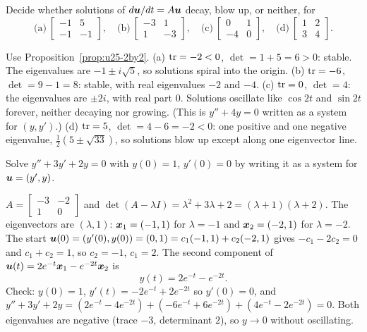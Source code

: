 \begin{exercise}\label{exr:u25-classify}
Decide whether solutions of $d\boldsymbol{u}/dt=A\boldsymbol{u}$ decay, blow up, or neither, for
\[
  \text{(a)}\ \begin{bmatrix} -1&5\\ -1&-1\end{bmatrix},\quad
  \text{(b)}\ \begin{bmatrix} -3&1\\ 1&-3\end{bmatrix},\quad
  \text{(c)}\ \begin{bmatrix} 0&1\\ -4&0\end{bmatrix},\quad
  \text{(d)}\ \begin{bmatrix} 1&2\\ 3&4\end{bmatrix}.
\]
\end{exercise}
\begin{solution}
Use Proposition~\ref{prop:u25-2by2}.
(a) $\operatorname{tr}=-2<0$, $\det=1+5=6>0$: stable. The eigenvalues are $-1\pm i\sqrt5$, so solutions
spiral into the origin.
(b) $\operatorname{tr}=-6$, $\det=9-1=8$: stable, with real eigenvalues $-2$ and $-4$.
(c) $\operatorname{tr}=0$, $\det=4$: the eigenvalues are $\pm2i$, with real part $0$. Solutions oscillate
like $\cos2t$ and $\sin2t$ forever, neither decaying nor growing. (This is $y''+4y=0$
written as a system for $(y,y')$.)
(d) $\operatorname{tr}=5$, $\det=4-6=-2<0$: one positive and one negative eigenvalue,
$\tfrac12(5\pm\sqrt{33})$, so solutions blow up except along one eigenvector line.
\end{solution}

\begin{exercise}\label{exr:u25-damped}
Solve $y''+3y'+2y=0$ with $y(0)=1$, $y'(0)=0$ by writing it as a system for
$\boldsymbol{u}=(y',y)$.
\end{exercise}
\begin{solution}
$A=\left[\begin{smallmatrix} -3&-2\\ 1&0\end{smallmatrix}\right]$ and
$\det(A-\lambda I)=\lambda^{2}+3\lambda+2=(\lambda+1)(\lambda+2)$. The eigenvectors are
$(\lambda,1)$: $\boldsymbol{x}_1=(-1,1)$ for $\lambda=-1$ and $\boldsymbol{x}_2=(-2,1)$ for $\lambda=-2$.
The start $\boldsymbol{u}(0)=(y'(0),y(0))=(0,1)=c_1(-1,1)+c_2(-2,1)$ gives $-c_1-2c_2=0$ and
$c_1+c_2=1$, so $c_2=-1$, $c_1=2$. The second component of
$\boldsymbol{u}(t)=2e^{-t}\boldsymbol{x}_1-e^{-2t}\boldsymbol{x}_2$ is
\[
  y(t)=2e^{-t}-e^{-2t}.
\]
Check: $y(0)=1$, $y'(t)=-2e^{-t}+2e^{-2t}$ so $y'(0)=0$, and
$y''+3y'+2y=(2e^{-t}-4e^{-2t})+(-6e^{-t}+6e^{-2t})+(4e^{-t}-2e^{-2t})=0$. Both eigenvalues
are negative (trace $-3$, determinant $2$), so $y\to0$ without oscillating.
\end{solution}
